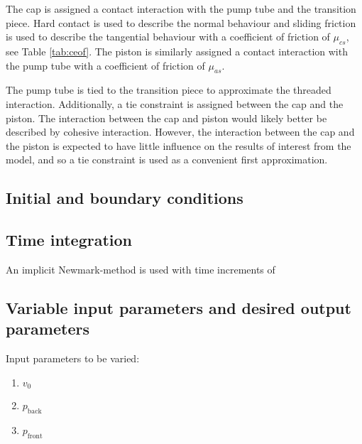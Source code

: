 \documentclass{article}
\begin{document}
The cap is assigned a contact interaction with the pump tube and the transition piece. Hard contact is used to describe the normal behaviour and sliding friction is used to describe the tangential behaviour with a coefficient of friction of $\mu_{cs}$, see Table \ref{tab:ceof}. The piston is similarly assigned a contact interaction with the pump tube with a coefficient of friction of $\mu_{as}$.

The pump tube is tied to the transition piece to approximate the threaded interaction. Additionally, a tie constraint is assigned between the cap and the piston. The interaction between the cap and piston would likely better be described by cohesive interaction. However, the interaction between the cap and the piston is expected to have little influence on the results of interest from the model, and so a tie constraint is used as a convenient first approximation.


\subsection{Initial and boundary conditions}

\subsection{Time integration}
An implicit Newmark-method is used with time increments of 


\subsection{Variable input parameters and desired output parameters}

Input parameters to be varied:
\begin{enumerate}
	\item $v_0$
	\item $p_{\text{back}}$
	\item $p_{\text{front}}$
\end{enumerate}
\end{document}
